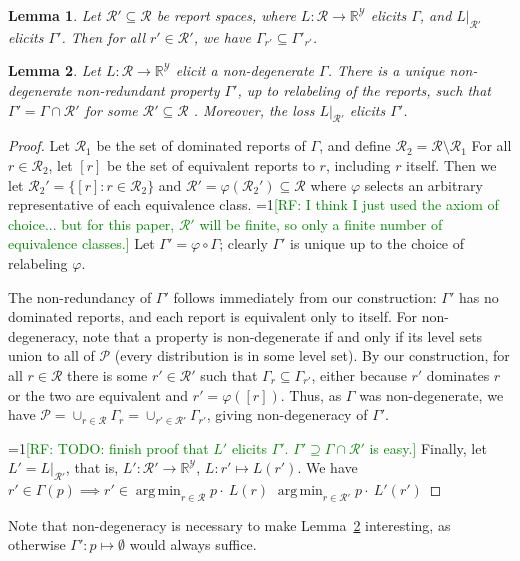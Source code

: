 \documentclass[11pt]{article}
\newcommand{\Comments}{1}
\newcommand{\mynote}[2]{\ifnum\Comments=1\textcolor{#1}{#2}\fi}
\newcommand{\raf}[1]{\mynote{green}{[RF: #1]}}
\newcommand{\reals}{\mathbb{R}}
\renewcommand{\P}{\mathcal{P}}
\newcommand{\R}{\mathcal{R}}
\newcommand{\Y}{\mathcal{Y}}
\DeclareMathOperator*{\argmin}{arg\,min}
\newtheorem{lemma}{Lemma}
\begin{document}
\begin{lemma}\label{lem:restrict-reports}
  Let $\R'\subseteq\R$ be report spaces, where $L:\R\to\reals^\Y$ elicits $\Gamma$, and $L|_{\R'}$ elicits $\Gamma'$.
  Then for all $r'\in\R'$, we have $\Gamma_{r'} \subseteq \Gamma'_{r'}$.  
\end{lemma}

\begin{lemma}\label{lem:trim}
  Let $L:\R\to\reals^\Y$ elicit a non-degenerate $\Gamma$.
  There is a unique non-degenerate non-redundant property $\Gamma'$, up to relabeling of the reports, such that $\Gamma' = \Gamma\cap\R'$ for some $\R'\subseteq\R$ .
  Moreover, the loss $L|_{\R'}$ elicits $\Gamma'$.
\end{lemma}
\begin{proof}
  Let $\R_1$ be the set of dominated reports of $\Gamma$, and define $\R_2 = \R\setminus\R_1$
  For all $r \in \R_2$, let $[r]$ be the set of equivalent reports to $r$, including $r$ itself.
  Then we let $\R_2' = \{[r] : r\in\R_2\}$ and $\R' = \varphi(\R_2') \subseteq \R$ where $\varphi$ selects an arbitrary representative of each equivalence class.
  \raf{I think I just used the axiom of choice... but for this paper, $\R'$ will be finite, so only a finite number of equivalence classes.}
  Let $\Gamma' = \varphi \circ \Gamma$; clearly $\Gamma'$ is unique up to the choice of relabeling $\varphi$.

  The non-redundancy of $\Gamma'$ follows immediately from our construction: $\Gamma'$ has no dominated reports, and each report is equivalent only to itself.
  For non-degeneracy, note that a property is non-degenerate if and only if its level sets union to all of $\P$ (every distribution is in some level set).
  By our construction, for all $r\in\R$ there is some $r'\in\R'$ such that $\Gamma_{r} \subseteq \Gamma_{r'}$, either because $r'$ dominates $r$ or the two are equivalent and $r' = \varphi([r])$.
  Thus, as $\Gamma$ was non-degenerate, we have $\P = \cup_{r\in\R} \Gamma_r = \cup_{r'\in\R'} \Gamma_{r'}$, giving non-degeneracy of $\Gamma'$.

\raf{TODO: finish proof that $L'$ elicits $\Gamma'$.  $\Gamma' \supseteq \Gamma \cap \R'$ is easy.}
  Finally, let $L' = L|_{\R'}$, that is, $L':\R'\to\reals^\Y$, $L:r'\mapsto L(r')$.
  We have $r' \in \Gamma(p) \implies r' \in \argmin_{r\in\R} p\cdot~L(r)$ $ \argmin_{r\in\R'} p\cdot~L'(r') $
\end{proof}
Note that non-degeneracy is necessary to make Lemma~\ref{lem:trim} interesting, as otherwise $\Gamma' : p \mapsto \emptyset$ would always suffice.
\end{document}
